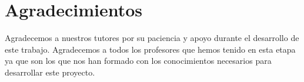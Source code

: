 
\chapter*{Agradecimientos}

Agradecemos a nuestros tutores por su paciencia y apoyo durante el desarrollo de este trabajo. Agradecemos a todos los profesores que hemos tenido en esta etapa ya que son los que nos han formado con los conocimientos necesarios para desarrollar este proyecto.








